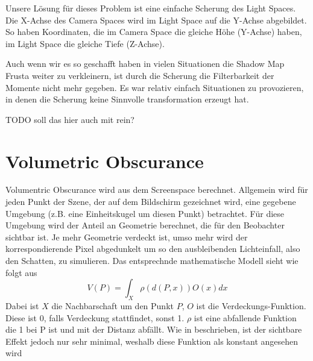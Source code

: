 \documentclass[runningheaders,a4paper]{llncs}
\begin{document}
Unsere Lösung für dieses Problem ist eine einfache Scherung des Light Spaces.
Die X-Achse des Camera Spaces wird im Light Space auf die Y-Achse abgebildet.
So haben Koordinaten, die im Camera Space die gleiche Höhe (Y-Achse) haben, im Light Space die gleiche Tiefe (Z-Achse).

Auch wenn wir es so geschafft haben in vielen Situationen die Shadow Map Frusta weiter zu verkleinern, ist durch die Scherung die Filterbarkeit der Momente \cite{msm} nicht mehr gegeben.
Es war relativ einfach Situationen zu provozieren, in denen die Scherung keine Sinnvolle transformation erzeugt hat.

TODO soll das hier auch mit rein?



\section{Volumetric Obscurance}

Volumentric Obscurance wird aus dem Screenspace berechnet. Allgemein wird für jeden Punkt der Szene, der auf
dem Bildschirm gezeichnet wird, eine gegebene Umgebung (z.B. eine Einheitskugel um diesen Punkt) betrachtet.
Für diese Umgebung wird der Anteil an Geometrie berechnet, die für den Beobachter sichtbar ist. Je mehr Geometrie
verdeckt ist, umso mehr wird der korrespondierende Pixel abgedunkelt um so den ausbleibenden Lichteinfall,
also den Schatten, zu simulieren.
Das entsprechnde mathematische Modell sieht wie folgt aus \cite{voPaper}
$$
V(P) = \int_{X} \rho (d(P,x))O(x)dx
$$
Dabei ist $X$ die Nachbarschaft um den Punkt $P$, $O$ ist die Verdeckungs-Funktion. Diese
ist 0, falls Verdeckung stattfindet, sonst 1. $\rho$ ist eine abfallende Funktion
die 1 bei P ist und mit der Distanz abfällt. Wie in \cite{voPaper} beschrieben, ist der 
sichtbare Effekt jedoch nur sehr minimal, weshalb diese Funktion als konstant angesehen 
wird \cite{voPaper}
\end{document}
